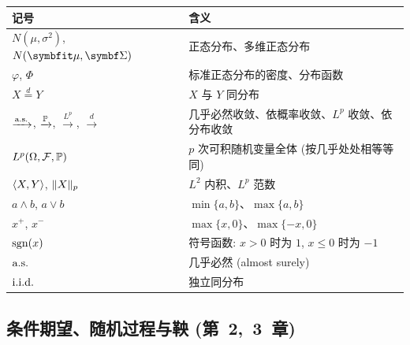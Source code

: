 \begin{center}
\small\renewcommand{\arraystretch}{1.1}
\begin{tabular}{>{\raggedright\arraybackslash}p{} >{\raggedright\arraybackslash}p{}}
\toprule
\textbf{记号} & \textbf{含义} \\
\midrule
$N(\mu,\sigma^2)$, $N(\rvec{\mu},\mat{\Sigma})$ & 正态分布、多维正态分布 \\
$\varphi$, $\Phi$ & 标准正态分布的密度、分布函数 \\
$X\overset{d}{=}Y$ & $X$ 与 $Y$ 同分布 \\
$\xrightarrow{\as}$, $\xrightarrow{\P}$, $\xrightarrow{L^p}$, $\xrightarrow{d}$ & 几乎必然收敛、依概率收敛、$L^p$ 收敛、依分布收敛 \\
$L^p(\Omega,\mathcal{F},\P)$ & $p$ 次可积随机变量全体 (按几乎处处相等等同) \\
$\ip{X,Y}$, $\norm{X}_p$ & $L^2$ 内积、$L^p$ 范数 \\
$a\wedge b$, $a\vee b$ & $\min\{a,b\}$、$\max\{a,b\}$ \\
$x^+$, $x^-$ & $\max\{x,0\}$、$\max\{-x,0\}$ \\
$\sgn(x)$ & 符号函数: $x>0$ 时为 $1$, $x\le0$ 时为 $-1$ \\
$\as$ & 几乎必然 (almost surely) \\
$\iid$ & 独立同分布 \\
\bottomrule
\end{tabular}
\end{center}

\subsection*{条件期望、随机过程与鞅 (第~2,~3~章)}

